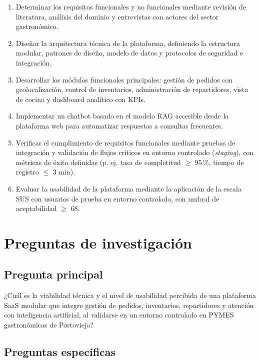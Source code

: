 \begin{enumerate}
    \item Determinar los requisitos funcionales y no funcionales mediante revisión de literatura, análisis del dominio y entrevistas con actores del sector gastronómico.
    
    \item Diseñar la arquitectura técnica de la plataforma, definiendo la estructura modular, patrones de diseño, modelo de datos y protocolos de seguridad e integración.
    
    \item Desarrollar los módulos funcionales principales: gestión de pedidos con geolocalización, control de inventarios, administración de repartidores, vista de cocina y dashboard analítico con KPIs.
    
    \item Implementar un chatbot basado en el modelo RAG accesible desde la plataforma web para automatizar respuestas a consultas frecuentes.
    
    \item Verificar el cumplimiento de requisitos funcionales mediante pruebas de integración y validación de flujos críticos en entorno controlado (\textit{staging}), con métricas de éxito definidas (p. ej. tasa de completitud $\geq$ 95\,\%, tiempo de registro $\leq$ 3 min).
    
    \item Evaluar la usabilidad de la plataforma mediante la aplicación de la escala SUS con usuarios de prueba en entorno controlado, con umbral de aceptabilidad $\geq$ 68.
\end{enumerate}

\section{Preguntas de investigación}

\subsection{Pregunta principal}

¿Cuál es la viabilidad técnica y el nivel de usabilidad percibida de una plataforma SaaS modular que integre gestión de pedidos, inventarios, repartidores y atención con inteligencia artificial, al validarse en un entorno controlado en PYMES gastronómicas de Portoviejo?

\subsection{Preguntas específicas}

